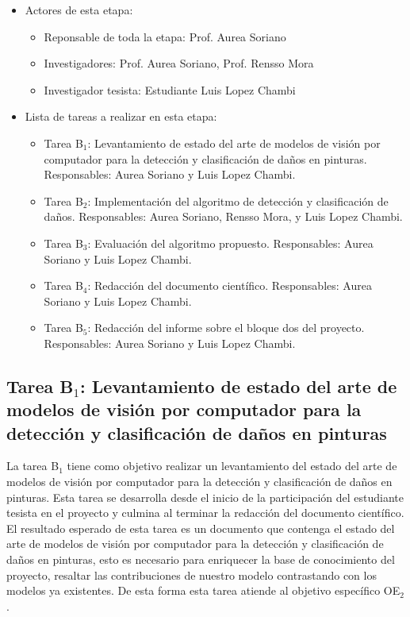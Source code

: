 \begin{itemize}
    \item Actores de esta etapa:

    \begin{itemize}
        \item Reponsable de toda la etapa: Prof. Aurea Soriano
        \item Investigadores: Prof. Aurea Soriano, Prof. Rensso Mora
        \item Investigador tesista: Estudiante Luis Lopez Chambi 
    \end{itemize}


        \item Lista de tareas a realizar en esta etapa:

    \begin{itemize}
        \item Tarea B$_1$: Levantamiento de estado del arte de modelos de visión por computador para la detección y clasificación de daños en pinturas. Responsables: Aurea Soriano y Luis Lopez Chambi.
        \item Tarea B$_2$: Implementación del algoritmo de detección y clasificación de daños. Responsables: Aurea Soriano, Rensso Mora, y Luis Lopez Chambi. 
        \item Tarea B$_3$: Evaluación del algoritmo propuesto. Responsables: Aurea Soriano y Luis Lopez Chambi.
        \item Tarea B$_4$: Redacción del documento científico. Responsables: Aurea Soriano y Luis Lopez Chambi.
        \item Tarea B$_5$: Redacción del informe sobre el bloque dos del proyecto. Responsables: Aurea Soriano y Luis Lopez Chambi. 
    \end{itemize}

\end{itemize}


\subsection{Tarea B$_1$: Levantamiento de estado del arte de modelos de visión por computador para la detección y clasificación de daños en pinturas}

La tarea B$_1$ tiene como objetivo realizar un levantamiento del estado del arte de modelos de visión por computador para la detección y clasificación de daños en pinturas.
Esta tarea se desarrolla desde el inicio de la participación del estudiante tesista en el proyecto y culmina al terminar la redacción del documento científico.
El resultado esperado de esta tarea es un documento que contenga el estado del arte de modelos de visión por computador para la detección y clasificación 
de daños en pinturas, esto es necesario para enriquecer la base de conocimiento del proyecto, resaltar las contribuciones de nuestro modelo contrastando
con los modelos ya existentes. De esta forma esta tarea atiende al objetivo específico OE$_2$.


